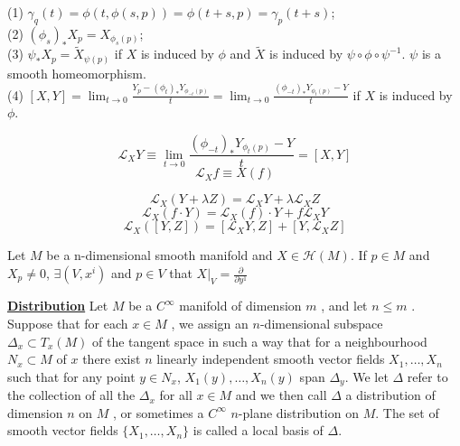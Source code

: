 \begin{newprop}
(1) $\gamma_q(t) = \phi(t,\phi(s,p)) = \phi(t+s,p) = \gamma_p(t+s)$;\\
(2) $(\phi_s)_{*}X_p = X_{\phi_s(p)}$;\\
(3) $\psi_{*} X_p = \tilde{X}_{\psi(p)}$ if $X$ is induced by $\phi$ and $\tilde{X}$ is induced by $\psi \circ \phi \circ \psi^{-1} $. $\psi$ is a smooth  homeomorphism.\\
(4) $[X,Y] = \lim_{t \to 0} \frac{Y_p-(\phi_t)_* Y_{\phi_{-t}(p)}}{t} = \lim_{t \to 0} \frac{(\phi_{-t})_*Y_{\phi_t(p)}- Y}{t}$ if $X$ is induced by $\phi$.
\end{newprop}

\begin{newdef}
\[\mathcal{L}_{X}Y \equiv \lim_{t \to 0} \frac{(\phi_{-t})_*Y_{\phi_t(p)}- Y}{t} =[X,Y]\]
\[\mathcal{L}_{X}f \equiv X(f)\]
\end{newdef}

\begin{newprop}
\[\mathcal{L}_{X}(Y + \lambda Z) = \mathcal{L}_{X}Y + \lambda\mathcal{L}_{X}Z\]
\[\mathcal{L}_{X}(f \cdot Y) = \mathcal{L}_{X}(f) \cdot Y + f\mathcal{L}_{X}Y\]
\[\mathcal{L}_{X}([Y,Z]) = [\mathcal{L}_{X}Y,Z]+ [Y,\mathcal{L}_{X}Z]\]
\end{newprop}

\begin{newthem}
Let $M$ be a n-dimensional smooth manifold and $X \in \mathcal{H}(M)$. If $p \in M$ and $X_p \neq 0$, $\exists (V,x^i)$ and $p \in V$ that $X|_V = \frac{\partial}{\partial y^1 }$
\end{newthem}

\begin{newdef}[Distribution]
\href{https://en.wikipedia.org/wiki/Distribution_(differential_geometry)}{\textbf{Distribution}} Let $M$ be a $C^{\infty }$  manifold of dimension $m$ , and let $n \leq m$ . Suppose that for each $x\in M$ , we assign an $n$-dimensional subspace $\Delta _{x}\subset T_{x}(M)$ of the tangent space in such a way that for a neighbourhood $N_{x}\subset M$ of $x$ there exist $n$ linearly independent smooth vector fields $X_{1},\ldots ,X_{n}$ such that for any point $y\in N_{x}$, $X_{1}(y),\ldots ,X_{n}(y)$ span $\Delta _{y}$. We let $\Delta$  refer to the collection of all the $\Delta_{x}$ for all $ x\in M$ and we then call $\Delta$ a distribution of dimension $n$ on $M$ , or sometimes a $C^{\infty }$ $n$-plane distribution on $M$. The set of smooth vector fields $\{X_{1},\ldots ,X_{n}\}$ is called a local basis of $\Delta$.
\end{newdef}

